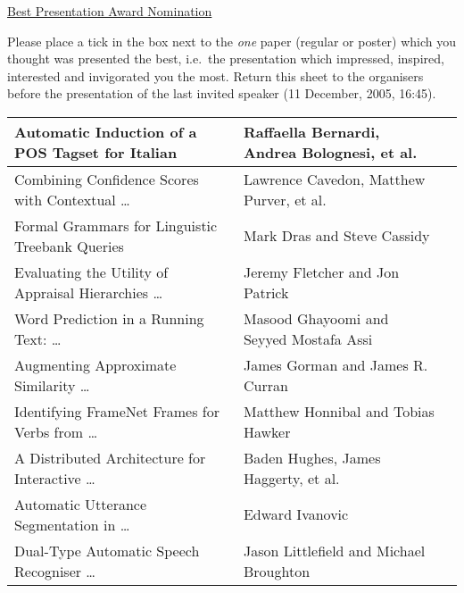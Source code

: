 \documentclass{article}
\begin{document}
\begin{center}
{\Huge \underline{Best Presentation Award Nomination}}

\vspace{1cm}

\begin{minipage}{14cm}
Please place a tick in the box next to the \emph{one} paper (regular
or poster) which you thought was presented the best, i.e.\ the
presentation which impressed, inspired, interested and invigorated you
the most.  Return this sheet to the organisers before the presentation
of the last invited speaker (11 December, 2005, 16:45).
\end{minipage}

\vspace{1cm}

\begin{tabular}{|p{}|p{}||p{}|}
\hline

Automatic Induction of a POS Tagset for Italian &
Raffaella Bernardi, Andrea Bolognesi, et al. &
\\ \hline

Combining Confidence Scores with Contextual \ldots &
Lawrence Cavedon, Matthew Purver, et al. &
\\ \hline

Formal Grammars for Linguistic Treebank Queries &
Mark Dras and Steve Cassidy &
\\ \hline

Evaluating the Utility of Appraisal Hierarchies \ldots &
Jeremy Fletcher and Jon Patrick &
\\ \hline

Word Prediction in a Running Text: \ldots &
Masood Ghayoomi and Seyyed Mostafa Assi &
\\ \hline

Augmenting Approximate Similarity \ldots &
James Gorman and James R. Curran &
\\ \hline

Identifying FrameNet Frames for Verbs from \ldots &
Matthew Honnibal and Tobias Hawker &
\\ \hline

A Distributed Architecture for Interactive \ldots &
Baden Hughes, James Haggerty, et al. &
\\ \hline

Automatic Utterance Segmentation in \ldots &
Edward Ivanovic &
\\ \hline

Dual-Type Automatic Speech Recogniser \ldots &
Jason Littlefield and Michael Broughton &
\\ \hline


\end{tabular}
\end{center}
\end{document}
